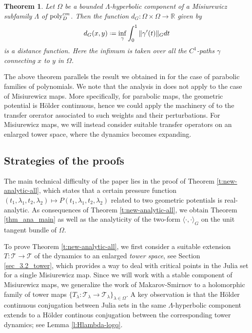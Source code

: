\documentclass[11pt]{amsart}
\theoremstyle{plain}
\newtheorem{thm}{Theorem}[section]
\theoremstyle{definition}
\theoremstyle{remark}
\newcommand*{\defeq}{\mathrel{\vcenter{\baselineskip0.5ex \lineskiplimit0pt
			\hbox{\scriptsize.}\hbox{\scriptsize.}}}%
	=}
\begin{document}
\begin{thm}\label{thm_main}
Let $\Omega$ be a bounded $\Lambda$-hyperbolic component of a Misiurewicz subfamily $\Lambda$ of ${\rm poly}_D^{cm}$.
Then the function $d_G: \Omega \times \Omega \to \mathbb R$ given by
\begin{equation*}
d_G(x,y) \defeq \inf_\gamma \int_0^1 \|\gamma'(t)\|_G dt
\end{equation*}
is a distance function. Here
the infimum is taken over all the $C^1$-paths $\gamma$ connecting $x$ to $y$ in $\Omega$.
\end{thm}

The above theorem parallels the result we obtained 
in \cite{BH24} for the case of parabolic families of polynomials. We note that the analysis in \cite{BH24} does not apply to the case of Misiurewicz maps. More specifically, for parabolic maps, the geometric potential is H\"older continuous, hence we could apply  
the machinery of \cite{BD23eq1, BD24eq2} to the transfer orerator associated to such weights and their perturbations.
For Misiurewicz maps, we will instead
consider suitable transfer operators on an enlarged tower space, where the dynamics becomes expanding.


\subsection{Strategies of the proofs} \label{sec_proof_strategy}
The main technical difficulty of the paper lies in the proof of Theorem \ref{t:new-analytic-all},
which states that 
a
certain pressure function $(t_1,\lambda_1, t_2, \lambda_2) \mapsto P(t_1,\lambda_1, t_2, \lambda_2)$ related to two geometric potentials
is real-analytic. As consequences of Theorem \ref{t:new-analytic-all}, we obtain Theorem \ref{thm_ana_main} as well as the analyticity of the two-form $\langle \cdot, \cdot \rangle_G$ on the unit tangent bundle of $\Omega$. 

To prove Theorem \ref{t:new-analytic-all}, we first consider
a suitable extension
$T \colon \mathcal{T} \to \mathcal{T}$
of the dynamics to an enlarged \emph{tower space}, 
see Section \ref{sec_3.2_tower},
which provides a way to deal with critical points in the Julia set for a single Misiurewicz map. Since we will work with a stable component of Misiurewicz maps, we generalize the work
of Makarov-Smirnov \cite{MakSmir03} to a holomorphic family of tower maps $\{T_\lambda \colon \mathcal{T}_\lambda \to \mathcal{T}_\lambda\}_{\lambda\in \Omega}$. A key observation is that the H\"older continuous conjugation between Julia sets in the same 
$\Lambda$-hyperbolic 
component extends to a H\"older continous conjugation between the corresponding tower dynamics; see Lemma \ref{l:Hlambda-logq}.
\end{document}
